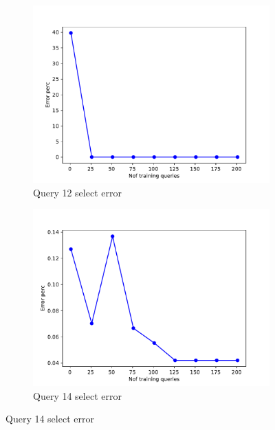 \begin{figure}[!htb]
   \begin{subfigure}[t]{0.5\textwidth}
     \includegraphics[scale=0.4]{figs/tpch10/tpch10_sel12_error.pdf}
     \caption{Query 12 select error}
     \label{fig:tpch_sel12}
   \end{subfigure}
   \begin{subfigure}[t]{0.5\textwidth}
     \includegraphics[scale=0.4]{figs/tpch10/tpch10_sel14_error.pdf}
     \caption{Query 14 select error}
     \label{fig:tpch_sel14}
    \end{subfigure}


\end{figure}
